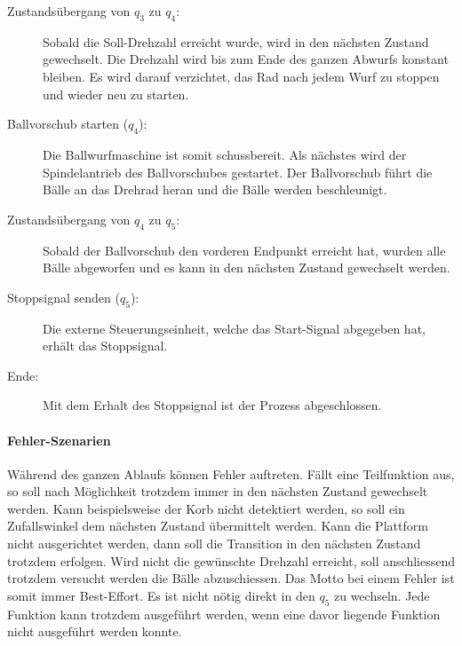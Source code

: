 \begin{description}
	\item[Zustandsübergang von $q_{3}$ zu $q_{4}$:]	Sobald die Soll-Drehzahl erreicht wurde, wird in den nächsten Zustand gewechselt. Die Drehzahl wird bis zum Ende des ganzen Abwurfs konstant bleiben. Es wird darauf verzichtet, das Rad nach jedem Wurf zu stoppen und wieder neu zu starten.
	
	\item[Ballvorschub starten ($q_{4}$):] Die Ballwurfmaschine ist somit schussbereit. Als nächstes wird der Spindelantrieb des Ballvorschubes gestartet. Der Ballvorschub führt die Bälle an das Drehrad heran und die Bälle werden beschleunigt. 
	
	\item[Zustandsübergang von $q_{4}$ zu $q_{5}$:]	Sobald der Ballvorschub den vorderen Endpunkt erreicht hat, wurden alle Bälle abgeworfen und es kann in den nächsten Zustand gewechselt werden.
	
	\item[Stoppsignal senden ($q_{5}$):] Die externe Steuerungseinheit, welche das Start-Signal abgegeben hat, erhält das Stoppsignal.
	
	\item[Ende:]	Mit dem Erhalt des Stoppsignal ist der Prozess abgeschlossen.
	
\end{description}

\paragraph{Fehler-Szenarien}
Während des ganzen Ablaufs können Fehler auftreten. Fällt eine Teilfunktion aus, so soll nach Möglichkeit trotzdem immer in den nächsten Zustand gewechselt werden. Kann beispielsweise der Korb nicht detektiert werden, so soll ein Zufallswinkel dem nächsten Zustand übermittelt werden. Kann die Plattform nicht ausgerichtet werden, dann soll die Transition in den nächsten Zustand trotzdem erfolgen. Wird nicht die gewünschte Drehzahl erreicht, soll anschliessend trotzdem versucht werden die Bälle abzuschiessen. Das Motto bei einem Fehler ist somit immer Best-Effort. Es ist nicht nötig direkt in den $q_{5}$ zu wechseln. Jede Funktion kann trotzdem ausgeführt werden, wenn eine davor liegende Funktion nicht ausgeführt werden konnte.
